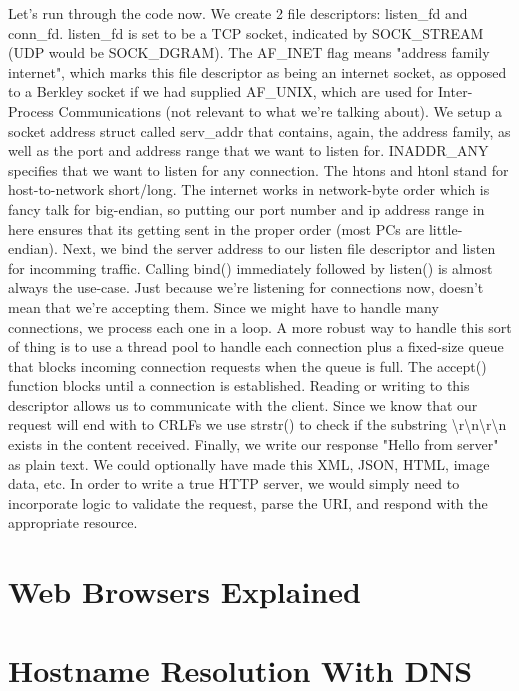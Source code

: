 \documentclass{article}
\begin{document}
Let's run through the code now. We create 2 file descriptors: listen\_fd and conn\_fd. listen\_fd is set to be
a TCP socket, indicated by SOCK\_STREAM (UDP would be SOCK\_DGRAM). The AF\_INET flag means "address family
internet", which marks this file descriptor as being an internet socket, as opposed to a Berkley socket if we
had supplied AF\_UNIX, which are used for Inter-Process Communications (not relevant to what we're talking
about). We setup a socket address struct called serv\_addr that contains, again, the address family, as well as
the port and address range that we want to listen for. INADDR\_ANY specifies that we want to listen for any
connection. The htons and htonl stand for host-to-network short/long. The internet works in network-byte
order which is fancy talk for big-endian, so putting our port number and ip address range in here ensures
that its getting sent in the proper order (most PCs are little-endian). Next, we bind the server address to
our listen file descriptor and listen for incomming traffic. Calling bind() immediately followed by listen() is
almost always the use-case. Just because we're listening for connections now, doesn't mean that we're accepting
them. Since we might have to handle many connections, we process each one in a loop. A more robust way to handle
this sort of thing is to use a thread pool to handle each connection plus a fixed-size queue that blocks
incoming connection requests when the queue is full. The accept() function blocks until a connection is
established. Reading or writing to this descriptor allows us to communicate with the client. Since we know that
our request will end with to CRLFs we use strstr() to check if the substring
\textbackslash{}r\textbackslash{}n\textbackslash{}r\textbackslash{}n exists in the content received. Finally,
we write our response "Hello from server" as plain text. We could optionally have made this XML, JSON, HTML,
image data, etc. In order to write a true HTTP server, we would simply need to incorporate logic to validate
the request, parse the URI, and respond with the appropriate resource.

\section{Web Browsers Explained}

\section{Hostname Resolution With DNS}
\end{document}
